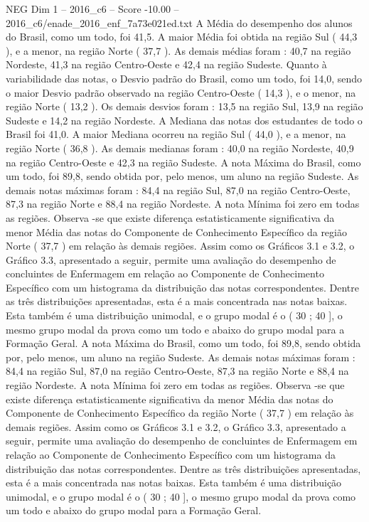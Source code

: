 \begin{textsample}{NEG Dim 1 – 2016\_c6 – Score -10.00 – 2016\_c6/enade\_2016\_enf\_7a73e021ed.txt}
A Média do desempenho dos alunos do Brasil, como um todo, foi 41,5.
A maior Média foi obtida na região Sul ( 44,3 ), e a menor, na região Norte ( 37,7 ).
As demais médias foram : 40,7 na região Nordeste, 41,3 na região Centro-Oeste e 42,4 na região Sudeste.
Quanto à variabilidade das notas, o Desvio padrão do Brasil, como um todo, foi 14,0, sendo o maior Desvio padrão observado na região Centro-Oeste ( 14,3 ), e o menor, na região Norte ( 13,2 ).
Os demais desvios foram : 13,5 na região Sul, 13,9 na região Sudeste e 14,2 na região Nordeste.
A Mediana das notas dos estudantes de todo o Brasil foi 41,0.
A maior Mediana ocorreu na região Sul ( 44,0 ), e a menor, na região Norte ( 36,8 ).
As demais medianas foram : 40,0 na região Nordeste, 40,9 na região Centro-Oeste e 42,3 na região Sudeste.
A nota Máxima do Brasil, como um todo, foi 89,8, sendo obtida por, pelo menos, um aluno na região Sudeste.
As demais notas máximas foram : 84,4 na região Sul, 87,0 na região Centro-Oeste, 87,3 na região Norte e 88,4 na região Nordeste.
A nota Mínima foi zero em todas as regiões.
Observa -se que existe diferença estatisticamente significativa da menor Média das notas do Componente de Conhecimento Específico da região Norte ( 37,7 ) em relação às demais regiões.
Assim como os Gráficos 3.1 e 3.2, o Gráfico 3.3, apresentado a seguir, permite uma avaliação do desempenho de concluintes de Enfermagem em relação ao Componente de Conhecimento Específico com um histograma da distribuição das notas correspondentes.
Dentre as três distribuições apresentadas, esta é a mais concentrada nas notas baixas.
Esta também é uma distribuição unimodal, e o grupo modal é o ( 30 ; 40 ], o mesmo grupo modal da prova como um todo e abaixo do grupo modal para a Formação Geral.
A nota Máxima do Brasil, como um todo, foi 89,8, sendo obtida por, pelo menos, um aluno na região Sudeste.
As demais notas máximas foram : 84,4 na região Sul, 87,0 na região Centro-Oeste, 87,3 na região Norte e 88,4 na região Nordeste.
A nota Mínima foi zero em todas as regiões.
Observa -se que existe diferença estatisticamente significativa da menor Média das notas do Componente de Conhecimento Específico da região Norte ( 37,7 ) em relação às demais regiões.
Assim como os Gráficos 3.1 e 3.2, o Gráfico 3.3, apresentado a seguir, permite uma avaliação do desempenho de concluintes de Enfermagem em relação ao Componente de Conhecimento Específico com um histograma da distribuição das notas correspondentes.
Dentre as três distribuições apresentadas, esta é a mais concentrada nas notas baixas.
Esta também é uma distribuição unimodal, e o grupo modal é o ( 30 ; 40 ], o mesmo grupo modal da prova como um todo e abaixo do grupo modal para a Formação Geral.

\end{textsample}
